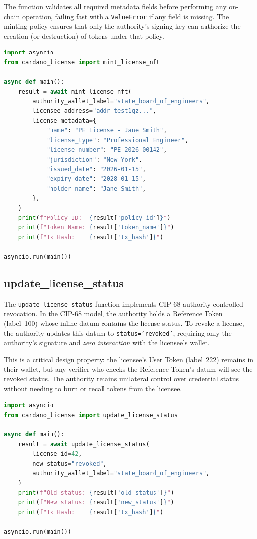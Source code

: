The function validates all required metadata fields before performing any
on-chain operation, failing fast with a \texttt{ValueError} if any field is
missing.  The minting policy ensures that only the authority's signing key
can authorize the creation (or destruction) of tokens under that policy.

\begin{lstlisting}[language=Python,
  caption={Minting a license NFT for a professional engineer.}]
import asyncio
from cardano_license import mint_license_nft

async def main():
    result = await mint_license_nft(
        authority_wallet_label="state_board_of_engineers",
        licensee_address="addr_test1qz...",
        license_metadata={
            "name": "PE License - Jane Smith",
            "license_type": "Professional Engineer",
            "license_number": "PE-2026-00142",
            "jurisdiction": "New York",
            "issued_date": "2026-01-15",
            "expiry_date": "2028-01-15",
            "holder_name": "Jane Smith",
        },
    )
    print(f"Policy ID:  {result['policy_id']}")
    print(f"Token Name: {result['token_name']}")
    print(f"Tx Hash:    {result['tx_hash']}")

asyncio.run(main())
\end{lstlisting}

\subsection{update\_license\_status}

The \texttt{update\_license\_status} function implements CIP-68
authority-controlled revocation.  In the CIP-68 model, the authority holds a
Reference Token (label~100) whose inline datum contains the license status.
To revoke a license, the authority updates this datum to
\texttt{status='revoked'}, requiring only the authority's signature and
\emph{zero interaction} with the licensee's wallet.

This is a critical design property: the licensee's User Token (label~222)
remains in their wallet, but any verifier who checks the Reference Token's
datum will see the revoked status.  The authority retains unilateral control
over credential status without needing to burn or recall tokens from the
licensee.

\begin{lstlisting}[language=Python,
  caption={Revoking a license via CIP-68 datum update.}]
import asyncio
from cardano_license import update_license_status

async def main():
    result = await update_license_status(
        license_id=42,
        new_status="revoked",
        authority_wallet_label="state_board_of_engineers",
    )
    print(f"Old status: {result['old_status']}")
    print(f"New status: {result['new_status']}")
    print(f"Tx Hash:    {result['tx_hash']}")

asyncio.run(main())
\end{lstlisting}

